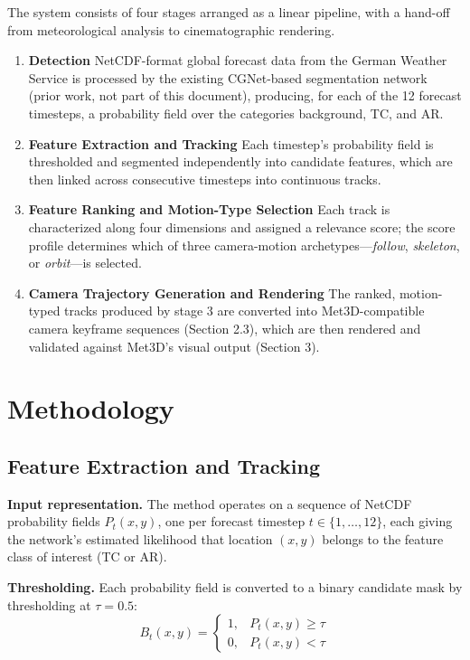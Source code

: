 \documentclass[journal abbreviation, manuscript]{copernicus}
\begin{document}
The system consists of four stages arranged as a linear pipeline, with a hand-off from meteorological analysis to cinematographic rendering.

\begin{enumerate}
    \item \textbf{Detection}
    NetCDF-format global forecast data from the German Weather Service is processed by the existing CGNet-based segmentation network (prior work, not part of this document), producing, for each of the 12 forecast timesteps, a probability field over the categories background, TC, and AR.

    \item \textbf{Feature Extraction and Tracking}
    Each timestep's probability field is thresholded and segmented independently into candidate features, which are then linked across consecutive timesteps into continuous tracks.

    \item \textbf{Feature Ranking and Motion-Type Selection}
    Each track is characterized along four dimensions and assigned a relevance score; the score profile determines which of three camera-motion archetypes---\textit{follow}, \textit{skeleton}, or \textit{orbit}---is selected.

    \item \textbf{Camera Trajectory Generation and Rendering}
    The ranked, motion-typed tracks produced by stage 3 are converted into Met3D-compatible camera keyframe sequences (Section 2.3), which are then rendered and validated against Met3D's visual output (Section 3).

\end{enumerate}

\section{Methodology}

\subsection{Feature Extraction and Tracking}

\textbf{Input representation.} The method operates on a sequence of NetCDF probability fields $P_t(x,y)$, one per forecast timestep $t \in \{1,\dots,12\}$, each giving the network's estimated likelihood that location $(x,y)$ belongs to the feature class of interest (TC or AR).

\textbf{Thresholding.} Each probability field is converted to a binary candidate mask by thresholding at $\tau = 0.5$:
\begin{equation}
B_t(x,y) =
\begin{cases}
1, & P_t(x,y) \geq \tau \\
0, & P_t(x,y) < \tau
\end{cases}
\tag{1}
\end{equation}
\end{document}
